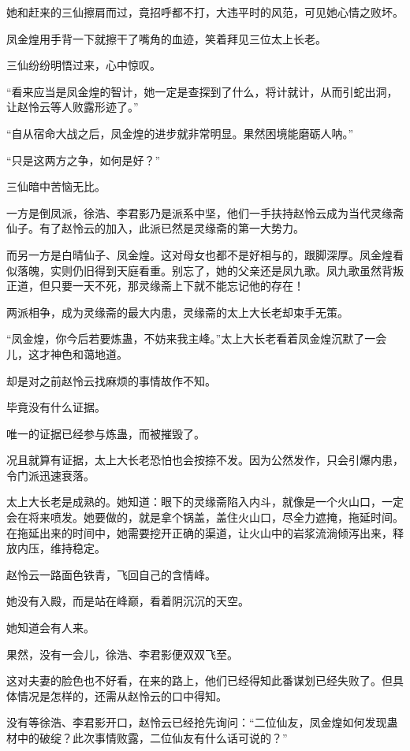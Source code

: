\begin{this_body}
她和赶来的三仙擦肩而过，竟招呼都不打，大违平时的风范，可见她心情之败坏。

凤金煌用手背一下就擦干了嘴角的血迹，笑着拜见三位太上长老。

三仙纷纷明悟过来，心中惊叹。

“看来应当是凤金煌的智计，她一定是查探到了什么，将计就计，从而引蛇出洞，让赵怜云等人败露形迹了。”

“自从宿命大战之后，凤金煌的进步就非常明显。果然困境能磨砺人呐。”

“只是这两方之争，如何是好？”

三仙暗中苦恼无比。

一方是倒凤派，徐浩、李君影乃是派系中坚，他们一手扶持赵怜云成为当代灵缘斋仙子。有了赵怜云的加入，此派已然是灵缘斋的第一大势力。

而另一方是白晴仙子、凤金煌。这对母女也都不是好相与的，跟脚深厚。凤金煌看似落魄，实则仍旧得到天庭看重。别忘了，她的父亲还是凤九歌。凤九歌虽然背叛正道，但只要一天不死，那灵缘斋上下就不能忘记他的存在！

两派相争，成为灵缘斋的最大内患，灵缘斋的太上大长老却束手无策。

“凤金煌，你今后若要炼蛊，不妨来我主峰。”太上大长老看着凤金煌沉默了一会儿，这才神色和蔼地道。

却是对之前赵怜云找麻烦的事情故作不知。

毕竟没有什么证据。

唯一的证据已经参与炼蛊，而被摧毁了。

况且就算有证据，太上大长老恐怕也会按捺不发。因为公然发作，只会引爆内患，令门派迅速衰落。

太上大长老是成熟的。她知道：眼下的灵缘斋陷入内斗，就像是一个火山口，一定会在将来喷发。她要做的，就是拿个锅盖，盖住火山口，尽全力遮掩，拖延时间。在拖延出来的时间中，她需要挖开正确的渠道，让火山中的岩浆流淌倾泻出来，释放内压，维持稳定。

赵怜云一路面色铁青，飞回自己的含情峰。

她没有入殿，而是站在峰巅，看着阴沉沉的天空。

她知道会有人来。

果然，没有一会儿，徐浩、李君影便双双飞至。

这对夫妻的脸色也不好看，在来的路上，他们已经得知此番谋划已经失败了。但具体情况是怎样的，还需从赵怜云的口中得知。

没有等徐浩、李君影开口，赵怜云已经抢先询问：“二位仙友，凤金煌如何发现蛊材中的破绽？此次事情败露，二位仙友有什么话可说的？”


\end{this_body}
